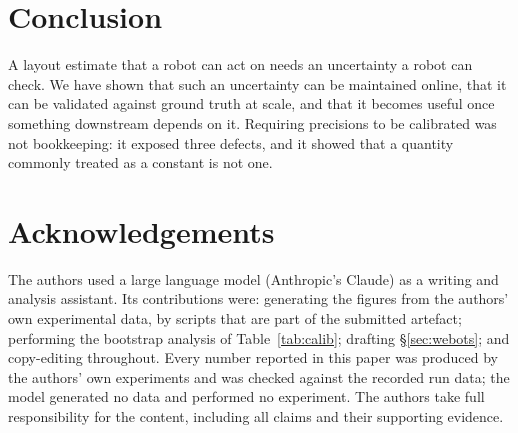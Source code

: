 \documentclass[conference,letterpaper,10pt]{IEEEtran}
\newif\ifcameraready
\begin{document}
\section{Conclusion}

A layout estimate that a robot can act on needs an uncertainty a robot can check. We have shown that
such an uncertainty can be maintained online, that it can be validated against ground truth at scale,
and that it becomes useful once something downstream depends on it. Requiring precisions to be
calibrated was not bookkeeping: it exposed three defects, and it showed that a quantity commonly
treated as a constant is not one.

\section*{Acknowledgements}

\ifcameraready
This work was co-funded by the FEDER Project 0124\_EUROAGE\_MAS\_4\_E under the POCTEP Programme
2021--2027, and by the R\&D\&i project PID2022-137344OB-C31, supported by
MICIU/AEI/10.13039/501100011033 and ``FEDER, Una manera de hacer Europa''. Additional co-funding was
provided by the European Union through the European Regional Development Fund (85\%) and by the Junta
de Extremadura (Grant GR24194). The managing authority is the Ministerio de Hacienda (Spain). This
work was also supported by the SWEET Project, a Horizon Europe Marie Sk\l{}odowska-Curie action
(Agreement No.\ 101168792).
\fi

The authors used a large language model (Anthropic's Claude) as a writing and analysis assistant. Its
contributions were: generating the figures from the authors' own experimental data, by scripts that
are part of the submitted artefact; performing the bootstrap analysis of
Table~\ref{tab:calib}; drafting \S\ref{sec:webots}; and copy-editing throughout. Every number reported
in this paper was produced by the authors' own experiments and was checked against the recorded run
data; the model generated no data and performed no experiment. The authors take full responsibility
for the content, including all claims and their supporting evidence.

\balance


\end{document}
